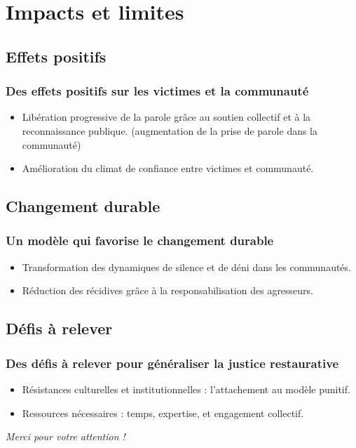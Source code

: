 \documentclass[french]{beamer}
\begin{document}
\section{Impacts et limites}
\subsection{Effets positifs}
\begin{frame}
  \frametitle{Des effets positifs sur les victimes et la communauté}
  \begin{itemize}
    \item Libération progressive de la parole grâce au soutien collectif et à la reconnaissance publique. (augmentation de la prise de parole dans la communauté)
    \item Amélioration du climat de confiance entre victimes et communauté.
  \end{itemize}
\end{frame}

\subsection{Changement durable}
\begin{frame}
  \frametitle{Un modèle qui favorise le changement durable}
  \begin{itemize}
    \item Transformation des dynamiques de silence et de déni dans les communautés.
    \item Réduction des récidives grâce à la responsabilisation des agresseurs.
  \end{itemize}
\end{frame}

\subsection{Défis à relever}
\begin{frame}
  \frametitle{Des défis à relever pour généraliser la justice restaurative}
  \begin{itemize}
    \item Résistances culturelles et institutionnelles : l’attachement au modèle punitif.
    \item Ressources nécessaires : temps, expertise, et engagement collectif.
  \end{itemize}
\end{frame}

\begin{frame}[plain]
  \addtocounter{framenumber}{-1}
  \begin{center}
    \huge
    \textit{Merci pour votre attention !}
  \end{center}
\end{frame}
\end{document}
